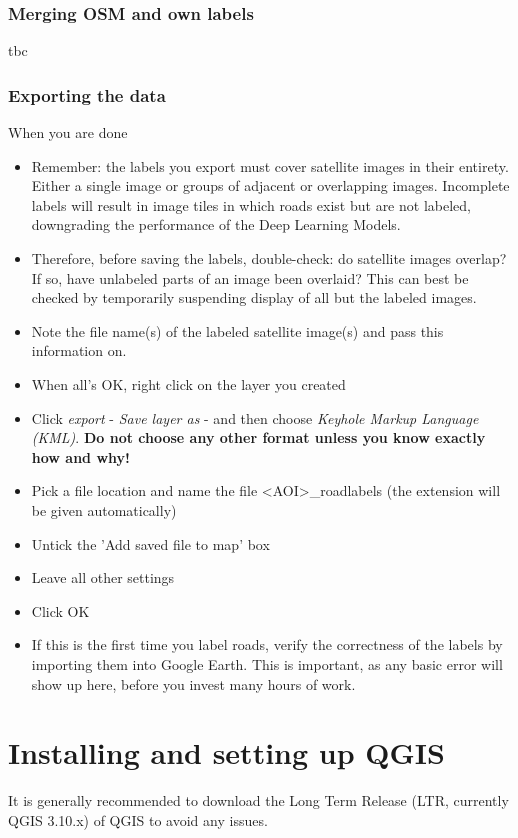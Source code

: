 \documentclass[12pt,a4paper]{scrartcl}
\begin{document}
\subsubsection{Merging OSM and own labels}
tbc

\subsubsection{Exporting the data}
When you are done 
\begin{itemize}
	\item Remember: the labels you export must cover satellite images in their entirety. Either a single image or groups of adjacent or overlapping images. Incomplete labels will result in image tiles in which roads exist but are not labeled, downgrading the performance of the Deep Learning Models. 
	\item Therefore, before saving the labels, double-check: do satellite images overlap? If so, have unlabeled parts of an image been overlaid? This can best be checked by temporarily suspending display of all but the labeled images.
	\item Note the file name(s) of the labeled satellite image(s) and pass this information on.
	\item When all's OK, right click on the layer you created
	\item Click  \textit{export} - \textit{Save layer as} - and then choose \textit{Keyhole Markup Language (KML)}. \textbf{Do not choose any other format unless you know exactly how and why!}
	\item Pick a file location and name the file <AOI>\_roadlabels (the extension will be given automatically)
	\item Untick the 'Add saved file to map' box
	\item Leave all other settings
	\item Click OK
	\item If this is the first time you label roads, verify the correctness of the labels by importing them into Google Earth. This is important, as any basic error will show up here, before you invest many hours of work.
\end{itemize}


\section{Installing and setting up QGIS}
\label{sec:qgis_install}
It is generally recommended to download the Long Term Release (LTR, currently QGIS 3.10.x) of QGIS to avoid any issues. \newline
\end{document}
